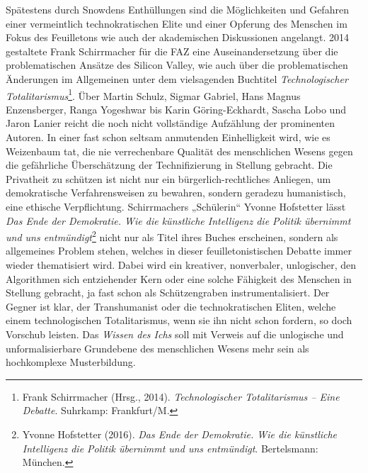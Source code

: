 \documentclass[12pt,a4paper]{article}
\begin{document}
Spätestens durch Snowdens Enthüllungen sind die Möglichkeiten und Gefahren
einer vermeintlich technokratischen Elite und einer Opferung des Menschen im
Fokus des Feuilletons wie auch der akademischen Diskussionen angelangt. 2014
gestaltete Frank Schirrmacher für die FAZ eine Auseinandersetzung über die
problematischen Ansätze des Silicon Valley, wie auch über die problematischen
Änderungen im Allgemeinen unter dem vielsagenden Buchtitel
\emph{Technologischer Totalitarismus}\footnote{Frank Schirrmacher (Hrsg.,
  2014). \emph{Technologischer Totalitarismus -- Eine Debatte}.  Suhrkamp:
  Frankfurt/M. }. Über Martin Schulz, Sigmar Gabriel, Hans Magnus
Enzensberger, Ranga Yogeshwar bis Karin Göring-Eckhardt, Sascha Lobo und Jaron
Lanier reicht die noch nicht vollständige Aufzählung der prominenten Autoren.
In einer fast schon seltsam anmutenden Einhelligkeit wird, wie es Weizenbaum
tat, die nie verrechenbare Qualität des menschlichen Wesens gegen die
gefährliche Überschätzung der Technifizierung in Stellung gebracht. Die
Privatheit zu schützen ist nicht nur ein bürgerlich-rechtliches Anliegen, um
demokratische Verfahrensweisen zu bewahren, sondern geradezu humanistisch,
eine ethische Verpflichtung.  Schirrmachers „Schülerin“ Yvonne Hofstetter
lässt \emph{Das Ende der Demokratie. Wie die künstliche Intelligenz die
  Politik übernimmt und uns entmündigt}\footnote{Yvonne Hofstetter (2016).
  \emph{Das Ende der Demokratie. Wie die künstliche Intelligenz die Politik
    übernimmt und uns entmündigt}. Bertelsmann: München. } nicht nur als Titel
ihres Buches erscheinen, sondern als allgemeines Problem stehen, welches in
dieser feuilletonistischen Debatte immer wieder thematisiert wird.  Dabei wird
ein kreativer, nonverbaler, unlogischer, den Algorithmen sich entziehender
Kern oder eine solche Fähigkeit des Menschen in Stellung gebracht, ja fast
schon als Schützengraben instrumentalisiert. Der Gegner ist klar, der
Transhumanist oder die technokratischen Eliten, welche einem technologischen
Totalitarismus, wenn sie ihn nicht schon fordern, so doch Vorschub
leisten. Das \emph{Wissen des Ichs} soll mit Verweis auf die unlogische und
unformalisierbare Grundebene des menschlichen Wesens mehr sein als
hochkomplexe Musterbildung.
\end{document}
